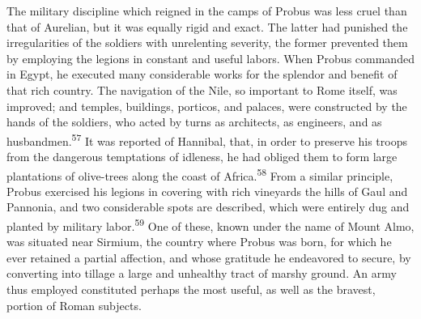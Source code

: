 The military discipline which reigned in the camps of Probus was
less cruel than that of Aurelian, but it was equally rigid and
exact. The latter had punished the irregularities of the soldiers
with unrelenting severity, the former prevented them by employing
the legions in constant and useful labors. When Probus commanded
in Egypt, he executed many considerable works for the splendor
and benefit of that rich country. The navigation of the Nile, so
important to Rome itself, was improved; and temples, buildings,
porticos, and palaces, were constructed by the hands of the
soldiers, who acted by turns as architects, as engineers, and as
husbandmen.\textsuperscript{57} It was reported of Hannibal, that, in order to
preserve his troops from the dangerous temptations of idleness,
he had obliged them to form large plantations of olive-trees
along the coast of Africa.\textsuperscript{58} From a similar principle, Probus
exercised his legions in covering with rich vineyards the hills
of Gaul and Pannonia, and two considerable spots are described,
which were entirely dug and planted by military labor.\textsuperscript{59} One of
these, known under the name of Mount Almo, was situated near
Sirmium, the country where Probus was born, for which he ever
retained a partial affection, and whose gratitude he endeavored
to secure, by converting into tillage a large and unhealthy tract
of marshy ground. An army thus employed constituted perhaps the
most useful, as well as the bravest, portion of Roman subjects.




